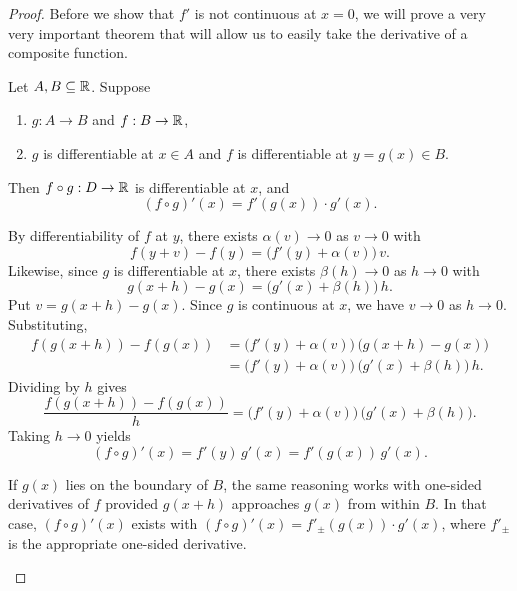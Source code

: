 \begin{problem}
\begin{proof}
    Before we show that $f'$  is not continuous at $x = 0$, we will prove a very 
    very important theorem that will allow us to easily take the derivative
    of a composite function.

    \begin{theorem}
      \label{thm:chain-rule}
      Let $A, B \subseteq \mathbb{R}$. Suppose
      \begin{enumerate}[label=(\alph*)]
        \item $g : A \to B$ and $f : B \to \mathbb{R}$,
        \item $g$ is differentiable at $x \in A$ and $f$ is differentiable at $y = g(x) \in B$.
      \end{enumerate}
      Then $f \circ g : D \to \mathbb{R}$ is differentiable at $x$, and
      \[
        (f \circ g)'(x) = f'(g(x)) \cdot g'(x).
      \]
    \end{theorem}

    \begin{subproof}
      By differentiability of $f$ at $y$, there exists $\alpha(v) \to 0$ as $v \to 0$ with
      \[
        f(y+v) - f(y) = \bigl( f'(y) + \alpha(v) \bigr)\, v.
      \]
      Likewise, since $g$ is differentiable at $x$, there exists $\beta(h) \to 0$ as $h \to 0$ with
      \[
        g(x+h) - g(x) = \bigl( g'(x) + \beta(h) \bigr)\, h.
      \]
      Put $v = g(x+h) - g(x)$. Since $g$ is continuous at $x$, we have $v \to 0$ as $h \to 0$. Substituting,
      \begin{align*}
        f(g(x+h)) - f(g(x))
        &= \bigl( f'(y) + \alpha(v) \bigr)\, \bigl( g(x+h) - g(x) \bigr) \\
        &= \bigl( f'(y) + \alpha(v) \bigr)\, \bigl( g'(x) + \beta(h) \bigr)\, h.
      \end{align*}
      Dividing by $h$ gives
      \[
        \frac{f(g(x+h)) - f(g(x))}{h} = \bigl( f'(y) + \alpha(v) \bigr)\, \bigl( g'(x) + \beta(h) \bigr).
      \]
      Taking $h \to 0$ yields
      \[
        (f \circ g)'(x) = f'(y)\, g'(x) = f'(g(x))\, g'(x).
      \]
    \end{subproof}

    \begin{callout}
      If $g(x)$ lies on the boundary of $B$, the same reasoning works with
      one-sided derivatives of $f$ provided $g(x+h)$ approaches $g(x)$ from
      within $B$. In that case, $(f \circ g)'(x)$ exists with
      $(f \circ g)'(x) = f'_\pm(g(x)) \cdot g'(x)$, where $f'_\pm$ is the
      appropriate one-sided derivative.
    \end{callout}


\end{proof}
\end{problem}
